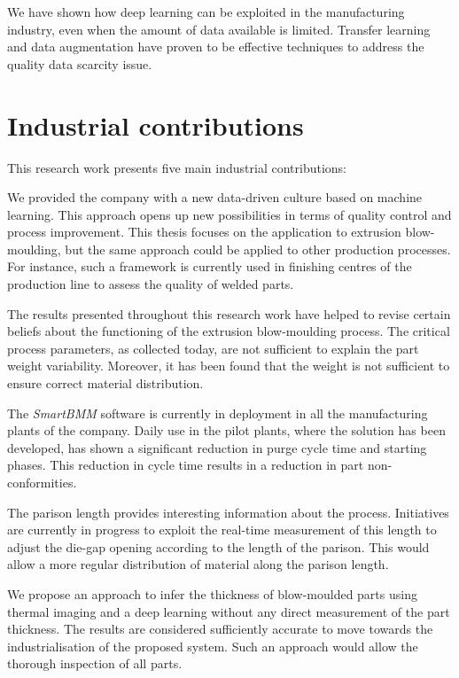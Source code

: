We have shown how deep learning can be exploited in the manufacturing industry, even when the amount of data available is limited. Transfer learning and data augmentation have proven to be effective techniques to address the quality data scarcity issue.  

\section*{Industrial contributions}

This research work presents five main industrial contributions:

We provided the company with a new data-driven culture based on machine learning. This approach opens up new possibilities in terms of quality control and process improvement. This thesis focuses on the application to extrusion blow-moulding, but the same approach could be applied to other production processes. For instance, such a framework is currently used in  finishing centres of the production line to assess the quality of welded parts.

The results presented throughout this research work have helped to revise certain beliefs about the functioning of the extrusion blow-moulding process. The critical process parameters, as collected today, are not sufficient to explain the part weight variability. Moreover, it has been found that the weight is not sufficient to ensure correct material distribution. 

The \textit{SmartBMM} software is currently in deployment in all the manufacturing plants of the company. Daily use in the pilot plants, where the solution has been developed, has shown a significant reduction in purge cycle time and starting phases. This reduction in cycle time results in a reduction in part non-conformities.

The parison length provides interesting information about the process. Initiatives are currently in progress to exploit the real-time measurement of this length to adjust the die-gap opening according to the length of the parison. This would allow a more regular distribution of material along the parison length. 

We propose an approach to infer the thickness of blow-moulded parts using thermal imaging and a deep learning without any direct measurement of the part thickness. The results are considered sufficiently accurate to move towards the industrialisation of the proposed system. Such an approach would allow the thorough inspection of all parts.   

